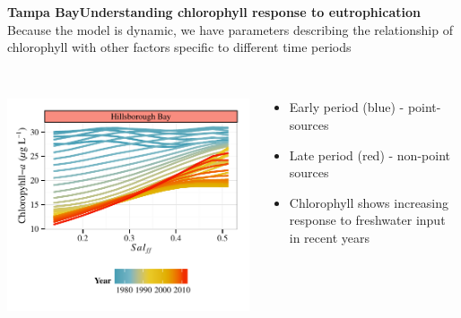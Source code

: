 \documentclass[serif]{beamer}\usepackage[]{graphicx}\usepackage[]{color}
\begin{document}
\begin{frame}{\textbf{Tampa Bay}}{\textbf{Understanding chlorophyll response to eutrophication}}
Because the model is dynamic, we have parameters describing the relationship of chlorophyll with other factors specific to different time periods \\~\\
\begin{columns}[T]
\begin{column}{0.45\textwidth}
\centerline{\includegraphics[width = \textwidth]{fig/hill.pdf}}
\end{column}
\begin{column}{0.45\textwidth}
\begin{itemize}
\item Early period (blue) - point-sources
\item Late period (red) - non-point sources
\item Chlorophyll shows increasing response to freshwater input in recent years
\end{itemize}
\end{column}
\end{columns}
\end{frame}
\end{document}
